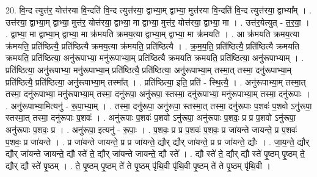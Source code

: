 \documentclass[17pt]{extarticle}
\begin{document}
20. वि॒न्द त्युत्त॑र॒ योत्त॑रया वि॒न्दति॑ वि॒न्द त्युत्त॑रया॒ द्वाभ्या॒म् द्वाभ्या॒ मुत्त॑रया वि॒न्दति॑ वि॒न्द त्युत्त॑रया॒ द्वाभ्या᳚म् । . उत्त॑रया॒ द्वाभ्या॒म् द्वाभ्या॒ मुत्त॑र॒ योत्त॑रया॒ द्वाभ्या॒ मा द्वाभ्या॒ मुत्त॑र॒ योत्त॑रया॒ द्वाभ्या॒ मा । . उत्त॑र॒येत्युत् - त॒र॒या॒ । . द्वाभ्या॒ मा द्वाभ्या॒म् द्वाभ्या॒ मा क्र॑मयति क्रमय॒त्या द्वाभ्या॒म् द्वाभ्या॒ मा क्र॑मयति । . आ क्र॑मयति क्रमय॒त्या क्र॑मयति॒ प्रति॑ष्ठित्यै॒ प्रति॑ष्ठित्यै क्रमय॒त्या क्र॑मयति॒ प्रति॑ष्ठित्यै । . क्र॒म॒य॒ति॒ प्रति॑ष्ठित्यै॒ प्रति॑ष्ठित्यै क्रमयति क्रमयति॒ प्रति॑ष्ठित्या॒ अनु॑रूपाभ्या॒ मनु॑रूपाभ्या॒म् प्रति॑ष्ठित्यै क्रमयति क्रमयति॒ प्रति॑ष्ठित्या॒ अनु॑रूपाभ्याम् । . प्रति॑ष्ठित्या॒ अनु॑रूपाभ्या॒ मनु॑रूपाभ्या॒म् प्रति॑ष्ठित्यै॒ प्रति॑ष्ठित्या॒ अनु॑रूपाभ्या॒म् तस्मा॒त् तस्मा॒ दनु॑रूपाभ्या॒म् प्रति॑ष्ठित्यै॒ प्रति॑ष्ठित्या॒ अनु॑रूपाभ्या॒म् तस्मा᳚त् । . प्रति॑ष्ठित्या॒ इति॒ प्रति॑ - स्थि॒त्यै॒ । . अनु॑रूपाभ्या॒म् तस्मा॒त् तस्मा॒ दनु॑रूपाभ्या॒ मनु॑रूपाभ्या॒म् तस्मा॒ दनु॑रूपा॒ अनु॑रूपा॒ स्तस्मा॒ दनु॑रूपाभ्या॒ मनु॑रूपाभ्या॒म् तस्मा॒ दनु॑रूपाः । . अनु॑रूपाभ्या॒मित्यनु॑ - रू॒पा॒भ्या॒म् । . तस्मा॒ दनु॑रूपा॒ अनु॑रूपा॒ स्तस्मा॒त् तस्मा॒ दनु॑रूपाः प॒शवः॑ प॒शवो ऽनु॑रूपा॒ स्तस्मा॒त् तस्मा॒ दनु॑रूपाः प॒शवः॑ । . अनु॑रूपाः प॒शवः॑ प॒शवो ऽनु॑रूपा॒ अनु॑रूपाः प॒शवः॒ प्र प्र प॒शवो ऽनु॑रूपा॒ अनु॑रूपाः प॒शवः॒ प्र । . अनु॑रूपा॒ इत्यनु॑ - रू॒पाः॒ । . प॒शवः॒ प्र प्र प॒शवः॑ प॒शवः॒ प्र जा॑यन्ते जायन्ते॒ प्र प॒शवः॑ प॒शवः॒ प्र जा॑यन्ते । . प्र जा॑यन्ते जायन्ते॒ प्र प्र जा॑यन्ते॒ द्यौर् द्यौर् जा॑यन्ते॒ प्र प्र जा॑यन्ते॒ द्यौः । . जा॒य॒न्ते॒ द्यौर् द्यौर् जा॑यन्ते जायन्ते॒ द्यौ स्ते॑ ते॒ द्यौर् जा॑यन्ते जायन्ते॒ द्यौ स्ते᳚ । . द्यौ स्ते॑ ते॒ द्यौर् द्यौ स्ते॑ पृ॒ष्ठम् पृ॒ष्ठम् ते॒ द्यौर् द्यौ स्ते॑ पृ॒ष्ठम् । . ते॒ पृ॒ष्ठम् पृ॒ष्ठम् ते॑ ते पृ॒ष्ठम् पृ॑थि॒वी पृ॑थि॒वी पृ॒ष्ठम् ते॑ ते पृ॒ष्ठम् पृ॑थि॒वी । \newline
\end{document}
